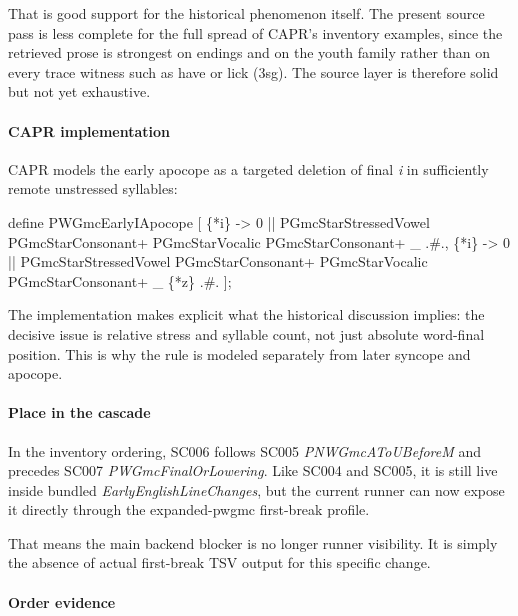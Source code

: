 \documentclass[
  british,
  a4paper,
]{article}
\newenvironment{Shaded}{}{}
\newcommand{\NormalTok}[1]{#1}
\begin{document}
That is good support for the historical phenomenon itself. The present
source pass is less complete for the full spread of CAPR's inventory
examples, since the retrieved prose is strongest on endings and on the
youth family rather than on every trace witness such as have or lick
(3sg). The source layer is therefore solid but not yet exhaustive.

\paragraph{CAPR implementation}\label{capr-implementation-3}

CAPR models the early apocope as a targeted deletion of final \emph{i}
in sufficiently remote unstressed syllables:

\begin{Shaded}
\begin{Highlighting}[]
\NormalTok{define PWGmcEarlyIApocope [}
\NormalTok{    \{*i\} {-}\textgreater{} 0 || PGmcStarStressedVowel PGmcStarConsonant+ PGmcStarVocalic PGmcStarConsonant+ \_ .\#.,}
\NormalTok{    \{*i\} {-}\textgreater{} 0 || PGmcStarStressedVowel PGmcStarConsonant+ PGmcStarVocalic PGmcStarConsonant+ \_ \{*z\} .\#.}
\NormalTok{];}
\end{Highlighting}
\end{Shaded}

The implementation makes explicit what the historical discussion
implies: the decisive issue is relative stress and syllable count, not
just absolute word-final position. This is why the rule is modeled
separately from later syncope and apocope.

\paragraph{Place in the cascade}\label{place-in-the-cascade-3}

In the inventory ordering, SC006 follows SC005 \emph{PNWGmcAToUBeforeM}
and precedes SC007 \emph{PWGmcFinalOrLowering}. Like SC004 and SC005, it
is still live inside bundled \emph{EarlyEnglishLineChanges}, but the
current runner can now expose it directly through the expanded-pwgmc
first-break profile.

That means the main backend blocker is no longer runner visibility. It
is simply the absence of actual first-break TSV output for this specific
change.

\paragraph{Order evidence}\label{order-evidence-3}
\end{document}
